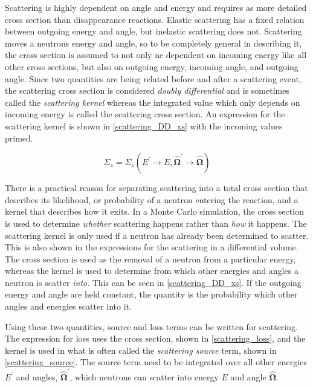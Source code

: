 Scattering is highly dependent on angle and energy and requires as more detailed cross section than disappearance reactions.  Elastic scattering has a fixed relation between outgoing energy and angle, but inelastic scattering does not.  Scattering moves a neutrons energy and angle, so to be completely general in describing it, the cross section is assumed to not only ne dependent on incoming energy like all other cross sections, but also on outgoing energy, incoming angle, and outgoing angle.  Since two quantities are being related before and after a scattering event, the scattering cross section is considered \emph{doubly differential} and is sometimes called the \emph{scattering kernel} whereas the integrated value which only depends on incoming energy is called the scattering cross section.   An expression for the scattering kernel is shown in \eqref{scattering_DD_xs} with the incoming values primed.

\begin{equation}
\label{scattering_DD_xs}
\Sigma_s = \Sigma_s(E^\prime \rightarrow E,\boldsymbol{\hat{\Omega}}^\prime \rightarrow \boldsymbol{\hat{\Omega}})
 \end{equation}

There is a practical reason for separating scattering into a total cross section that describes its likelihood, or probability of a neutron entering the reaction, and a kernel that describes how it exits.  In a Monte Carlo simulation, the cross section is used to determine \emph{whether} scattering happens rather than \emph{how} it happens.  The scattering kernel is only used if a neutron has already been determined to scatter.  This is also shown in the expressions for the scattering in a differential volume.  The cross section is used as the removal of a neutron from a particular energy, whereas the kernel is used to determine from which other energies and angles a neutron is scatter \emph{into}.  This can be seen in \eqref{scattering_DD_xs}.  If the outgoing energy and angle are held constant, the quantity is the probability which other angles and energies scatter into it.

Using these two quantities, source and loss terms can be written for scattering.  The expression for loss uses the cross section, shown in \eqref{scattering_loss}, and the kernel is used in what is often called the \emph{scattering source} term, shown in \eqref{scattering_source}.  The source term need to be integrated over all other energies $E^\prime$ and angles, $\boldsymbol{\hat{\Omega}}^\prime$, which neutrons can scatter into energy $E$ and angle $\boldsymbol{\hat{\Omega}}$.

